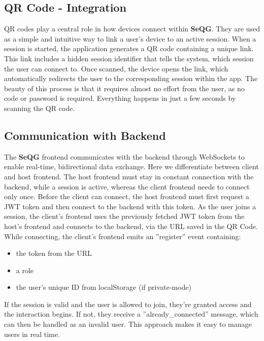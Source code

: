 \subsection{QR Code - Integration}
QR codes play a central role in how devices connect within \textbf{SeQG}. 
They are used as a simple and intuitive way to link a user's device to an active session. 
When a session is started, the application generates a QR code containing a unique link. 
This link includes a hidden session identifier that tells the system, which session the user can connect to.
Once scanned, the device opens the link, which automatically redirects the user to the corresponding session within the app. 
The beauty of this process is that it requires almost no effort from the user, as no code or password is required. 
Everything happens in just a few seconds by scanning the QR code.

\subsection{Communication with Backend}
The \textbf{SeQG} frontend communicates with the backend through WebSockets to enable real-time, bidirectional data exchange. 
Here we differentiate between client and host frontend.
The host frontend must stay in constant connection with the backend, while a session is active, whereas the client frontend needs to connect only once. 
Before the client can connect, the host frontend must first request a JWT token and then connect to the backend with this token.
As the user joins a session, the client's frontend uses the previously fetched JWT token from the host's frontend and connects to the backend, via the URL saved in the QR Code. 
While connecting, the client's frontend emits an ''register'' event containing:
\begin{itemize}
    \item the token from the URL
    \item a role
    \item the user's unique ID from localStorage (if private-mode)
\end{itemize}
If the session is valid and the user is allowed to join, they're granted access and the interaction begins. 
If not, they receive a ''already\_connected'' message, which can then be handled as an invalid user.
This approach makes it easy to manage users in real time.